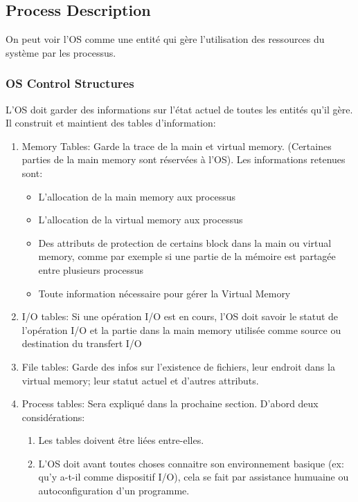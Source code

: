 \subsection{Process Description}
On peut voir l'OS comme une entité qui gère l'utilisation des ressources du système par les processus.

\subsubsection{OS Control Structures}
L'OS doit garder des informations sur l'état actuel de toutes les entités qu'il gère.
Il construit et maintient des tables d'information:
\begin{enumerate}
  \item
    Memory Tables: Garde la trace de la main et virtual memory.
    (Certaines parties de la main memory sont réservées à l'OS).
    Les informations retenues sont:
    \begin{itemize}
      \item L'allocation de la main memory aux processus
      \item L'allocation de la virtual memory aux processus
      \item Des attributs de protection de certains block dans la main ou virtual memory, comme par exemple si une partie de la mémoire est partagée entre plusieurs processus
      \item Toute information nécessaire pour gérer la Virtual Memory
    \end{itemize}
  \item I/O tables: Si une opération I/O est en cours, l'OS doit savoir le statut de l'opération I/O et la partie dans la main memory utilisée comme source ou destination du transfert I/O
  \item File tables: Garde des infos sur l'existence de fichiers, leur endroit dans la virtual memory; leur statut actuel et d'autres attributs.
  \item Process tables: Sera expliqué dans la prochaine section.
    D'abord deux considérations:
    \begin{enumerate}
      \item Les tables doivent être liées entre-elles.
      \item L'OS doit avant toutes choses connaitre son environnement basique (ex: qu'y a-t-il comme dispositif I/O), cela se fait par assistance humuaine ou autoconfiguration d'un programme.
    \end{enumerate}
\end{enumerate}

